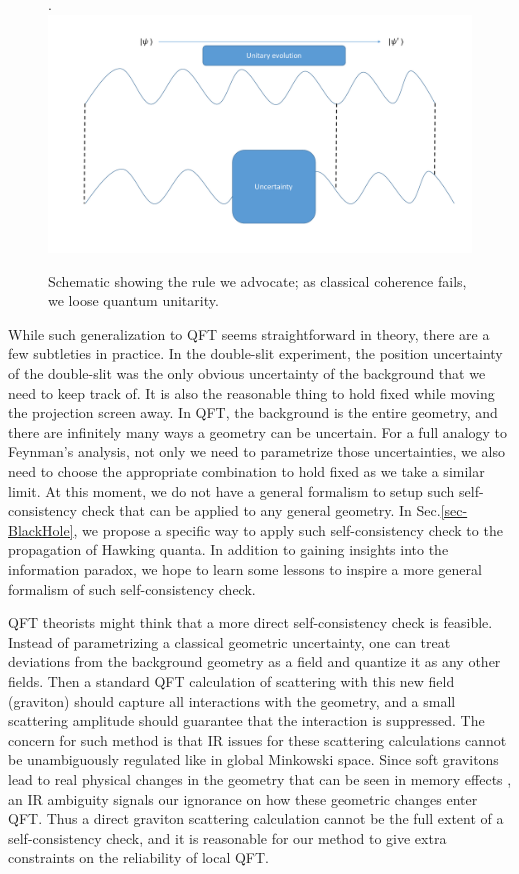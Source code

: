 \documentclass[aps,showpacs,twocolumn,floats,prd,superscriptaddress,nofootinbib]{revtex4-1}
\begin{document}
\begin{figure}[h!]
\begin{center}.
\includegraphics[scale = 0.5]{bh_coherence.pdf}
\caption{Schematic showing the rule we advocate; as classical coherence fails, we loose quantum unitarity.}
\label{fig-QFT}
\end{center}
\end{figure}

While such generalization to QFT seems straightforward in theory, there are a few subtleties in practice.
In the double-slit experiment, the position uncertainty of the double-slit was the only obvious uncertainty of the background that we need to keep track of.
It is also the reasonable thing to hold fixed while moving the projection screen away.
In QFT, the background is the entire geometry, and there are infinitely many ways a geometry can be uncertain.
For a full analogy to Feynman's analysis, not only we need to parametrize those uncertainties, we also need to choose the appropriate combination to hold fixed as we take a similar limit.
At this moment, we do not have a general formalism to setup such self-consistency check that can be applied to any general geometry. 
In Sec.\ref{sec-BlackHole}, we propose a specific way to apply such self-consistency check to the propagation of Hawking quanta.
In addition to gaining insights into the information paradox, we hope to learn some lessons to inspire a more general formalism of such self-consistency check.

QFT theorists might think that a more direct self-consistency check is feasible.
Instead of parametrizing a classical geometric uncertainty, one can treat deviations from the background geometry as a field and quantize it as any other fields.
Then a standard QFT calculation of scattering with this new field (graviton) should capture all interactions with the geometry, and a small scattering amplitude should guarantee that the interaction is suppressed. 
The concern for such method is that IR issues for these scattering calculations cannot be unambiguously regulated like in global Minkowski space.
Since soft gravitons lead to real physical changes in the geometry that can be seen in memory effects \cite{Wei65,HeLys14}, an IR ambiguity signals our ignorance on how these geometric changes enter QFT.
Thus a direct graviton scattering calculation cannot be the full extent of a self-consistency check, and it is reasonable for our method to give extra constraints on the reliability of local QFT.
\end{document}
